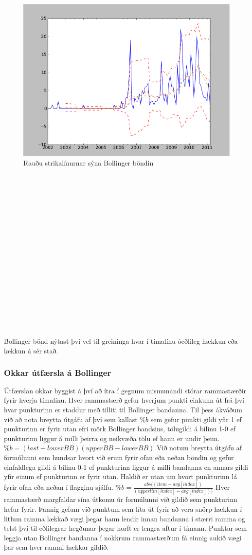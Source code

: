 \documentclass{article}
\begin{document}
\begin{figure}
 \begin{center}
 \includegraphics[width=.45\textwidth]{Bollinger.png}
 \caption{Rauðu strikalínurnar sýna Bollinger böndin}
  \end{center}
\end{figure}
\hfill
\\\\\\\\\\\\\\\\\\\\\\\\\\\\\\\\\\
Bollinger bönd nýtast því vel til greininga hvar í
tímalínu óeðlileg hækkun eða lækkun á sér stað.
\\
\subsubsection{Okkar útfærsla á Bollinger}
Útfærslan okkar byggist á því að ítra í gegnum
mismunandi stórar rammastærðir fyrir hverja tímalínu.
Hver rammastærð gefur hverjum punkti einkunn út frá því
hvar punkturinn er staddur með tilliti til Bollinger
bandanna.
Til þess ákváðum við að nota breytta útgáfu af því sem
kallast $\%b$ sem gefur punkti gildi yfir 1 ef
punkturinn er fyrir utan 
efri mörk Bollinger bandsins, tölugildi á bilinu 1-0 ef
punkturinn liggur á milli þeirra og neikvæða tölu ef
hann er undir þeim.
$\%b={(last-lowerBB)}{(upperBB-lowerBB)}$
Við notum breytta útgáfu af formúlunni sem hundsar
hvort við erum fyrir ofan eða neðan böndin og gefur
einfaldlega gildi á bilinu
0-1 ef punkturinn liggur á milli bandanna en annars
gildi yfir einum ef punkturinn er fyrir utan. Haldið er
utan um hvort punkturinn 
lá fyrir ofan eða neðan í flagginu sjálfu.
$\%b=\frac{abs((item - avg[index])}{(upperlim[index] -
avg[index]))}$
Hver rammastærð margfaldar sína útkomu úr formúlunni
við gildið sem punkturinn hefur fyrir.
Þannig gefum við punktum sem líta út fyrir að vera
snörp hækkun í litlum ramma lækkað vægi þegar hann
lendir innan bandanna í stærri ramma
og telst því til eðlilegrar hegðunar þegar horft er
lengra aftur í tímann.
Punktar sem leggja utan Bollinger bandanna í nokkrum
rammastærðum fá einnig aukið vægi þar sem hver rammi
hækkar gildið.
\end{document}
